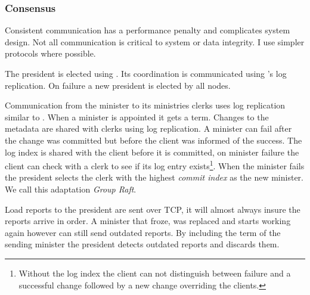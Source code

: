 \subsubsection*{Consensus} \label{sec:concensus} \label{sec:praft}
Consistent communication has a performance penalty and complicates system design. Not all communication is critical to system or data integrity. I use simpler protocols where possible. 

The president is elected using \raft{}. Its coordination is communicated using \raft{}'s log replication. On failure a new president is elected by all nodes.

Communication from the minister to its ministries clerks uses log replication similar to \raft{}. When a minister is appointed it gets a \raft{} term. Changes to the metadata are shared with clerks using log replication. A minister can fail after the change was committed but before the client was informed of the success. The log index is shared with the client before it is committed, on minister failure the client can check with a clerk to see if its log entry exists\footnote{Without the log index the client can not distinguish between failure and a successful change followed by a new change overriding the clients.}. When the minister fails the president selects the clerk with the highest \textsl{commit index} as the new minister. We call this adaptation \textit{Group Raft}.

Load reports to the president are sent over TCP, it will almost always insure the reports arrive in order. A minister that froze, was replaced and starts working again however can still send outdated reports. By including the term of the sending minister the president detects outdated reports and discards them.
%
